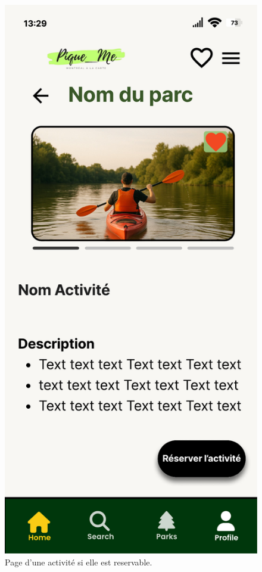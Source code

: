 \documentclass[12pt,a4paper]{article}
\begin{document}
\begin{figure}[h!]
  \centering
  \includegraphics[width=0.9\linewidth]{attachments/PageActivite.pdf}
  \caption{Page d'une activité si elle est reservable.}
\end{figure}
\end{document}

